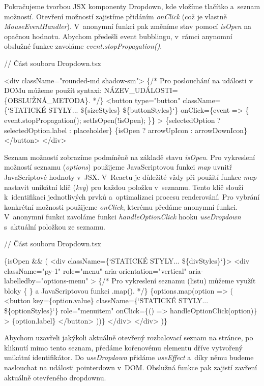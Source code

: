 Pokračujeme tvorbou JSX komponenty Dropdown, kde vložíme tlačítko a~seznam možností. Otevření možností zajistíme přidáním \emph{onClick} (což je vlastně \emph{MouseEventHandler}). 
V~anonymní funkci pak změníme stav pomocí \emph{isOpen} na opačnou hodnotu. Abychom předešli event bubblingu, v~rámci anynomní obslužné funkce zavoláme \emph{event.stopPropagation()}.

\begin{prog}
// Část souboru Dropdown.tsx

<div className="rounded-md shadow-sm">
  \{/* Pro poslouchání na události v DOMu můžeme použít syntaxi: 
    NÁZEV_UDÁLOSTI=\{OBSLUŽNÁ_METODA\}. */\}
  <button
    type="button"
    className=\{`STATICKÉ STYLY... \$\{sizeStyles\} \$\{buttonStyles\}`\}
    onClick=\{event => \{
      event.stopPropagation();
      setIsOpen(!isOpen);
    \}\}
  >
    \{selectedOption ? selectedOption.label : placeholder\}
    \{isOpen ? arrowUpIcon : arrowDownIcon\}
  </button>
</div>
\end{prog}

Seznam možností zobrazíme podmíněně na základě stavu \emph{isOpen}. Pro vykreslení možností seznamu (\emph{options}) použijeme JavaScriptovou funkci \emph{map} uvnitř JavaScriptové hodnoty v~JSX. 
V~Reactu je důležité vždy při použití funkce \emph{map} nastavit unikátní klíč (\emph{key}) pro každou položku v~seznamu. Tento klíč slouží k~identifikaci jednotlivých prvků a~optimalizaci procesu renderování. 
Pro vybrání konkrétní možnosti použijeme \emph{onClick}, kterému předáme anonymní funkci. V~anonymní funkci zavoláme funkci \emph{handleOptionClick} hooku \emph{useDropdown} s~aktuální položkou ze seznamu.

\begin{prog}
// Část souboru Dropdown.tsx

\{isOpen && (
  <div className=\{`STATICKÉ STYLY... \$\{divStyles\}`\}>
    <div
      className="py-1"
      role="menu"
      aria-orientation="vertical"
      aria-labelledby="options-menu"
    >
      \{/* Pro vykreslení seznamu (listu) můžeme využít bloky \{ \}
       a JavaScriptovou funkci .map(). */\}
      \{options.map(option => (
        <button
          key=\{option.value\}
          className=\{`STATICKÉ STYLY... \$\{optionStyles\}`\}
          role="menuitem"
          onClick=\{() => handleOptionClick(option)\}
        >
          \{option.label\}
        </button>
      ))\}
    </div>
  </div>
)\}
\end{prog}

Abychom uzavřeli jakýkoli aktuálně otevřený rozbalovací seznam na stránce, po kliknutí mimo tento seznam, předáme kořenovému elementu dříve vytvořený unikátní identifikátor. 
Do \emph{useDropdown} přidáme \emph{useEffect} a~díky němu budeme naslouchat na události pointerdown v~DOM. Obslužná funkce pak zajistí zavření aktuálně otevřeného dropdownu.

